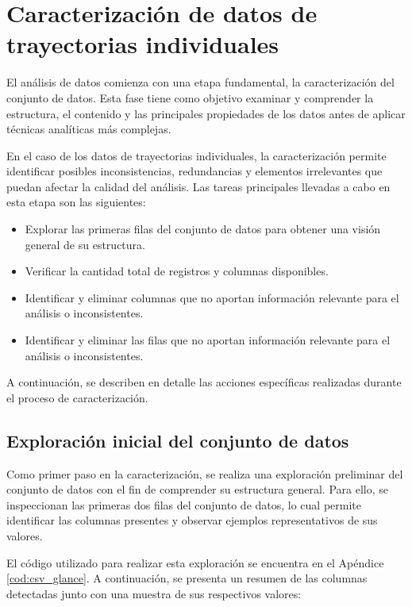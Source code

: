 \section{Caracterización de datos de trayectorias individuales}
\label{sec:caracterizacion}
El análisis de datos comienza con una etapa fundamental, la caracterización del conjunto de datos. Esta fase tiene como objetivo examinar y comprender la estructura, el contenido y las principales propiedades de los datos antes de aplicar técnicas analíticas más complejas. 

En el caso de los datos de trayectorias individuales, la caracterización permite identificar posibles inconsistencias, redundancias y elementos irrelevantes que puedan afectar la calidad del análisis. Las tareas principales llevadas a cabo en esta etapa son las siguientes:
\begin{itemize}
    \item Explorar las primeras filas del conjunto de datos para obtener una visión general de su estructura.
    \item Verificar la cantidad total de registros y columnas disponibles.
    \item Identificar y eliminar columnas que no aportan información relevante para el análisis o inconsistentes.
    \item Identificar y eliminar las filas que no aportan información relevante para el análisis o inconsistentes.
\end{itemize}
A continuación, se describen en detalle las acciones específicas realizadas durante el proceso de caracterización.
\vfill

\subsection{Exploración inicial del conjunto de datos}
\label{subsec:exploracion_inicial}
Como primer paso en la caracterización, se realiza una exploración preliminar del conjunto de datos con el fin de comprender su estructura general. Para ello, se inspeccionan las primeras dos filas del conjunto de datos, lo cual permite identificar las columnas presentes y observar ejemplos representativos de sus valores.

El código utilizado para realizar esta exploración se encuentra en el Apéndice \ref{cod:csv_glance}. A continuación, se presenta un resumen de las columnas detectadas junto con una muestra de sus respectivos valores:

